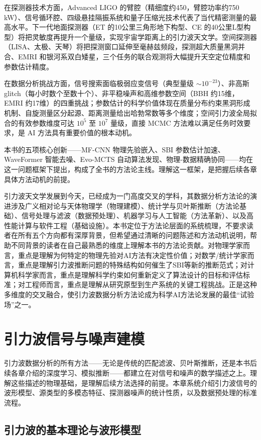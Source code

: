 在探测器技术方面，Advanced LIGO 的臂腔（精细度约450，臂腔功率约750 kW）、信号循环腔、四级悬挂隔振系统和量子压缩光技术代表了当代精密测量的最高水平。下一代地面探测器（ET 的10公里三角形地下构型、CE 的40公里L型构型）将把灵敏度再提升一个量级，实现宇宙学距离上的引力波天文学。空间探测器（LISA、太极、天琴）将把探测窗口延伸至毫赫兹频段，探测超大质量黑洞并合、EMRI 和银河系双白矮星，三个任务的联合观测将大幅提升天空定位精度和参数估计精度。

在数据分析挑战方面，信号搜索面临极弱应变信号（典型量级 $\sim10^{-23}$）、非高斯 glitch（每小时数个至数十个）、非平稳噪声和高维参数空间（BBH 约15维，EMRI 约17维）的四重挑战；参数估计的科学价值体现在质量分布约束黑洞形成机制、自旋测量区分起源、距离测量给出哈勃常数等多个维度；空间引力波全局拟合的有效参数维度可达 $10^5$ 至 $10^7$ 量级，直接 MCMC 方法难以满足任务时效要求，是 AI 方法具有重要价值的根本动机。

本书的五项核心创新——MF-CNN 物理先验嵌入、SBI 参数估计加速、WaveFormer 智能去噪、Evo-MCTS 自动算法发现、物理-数据精确协同——均在这一问题框架下提出，构成了全书的方法论主线。理解这一框架，是把握后续各章具体方法动机的前提。

引力波天文学发展到今天，已经成为一门高度交叉的学科，其数据分析方法论的演进涉及广义相对论与天体物理学（物理建模）、统计学与贝叶斯推断（方法论基础）、信号处理与滤波（数据预处理）、机器学习与人工智能（方法革新）、以及高性能计算与软件工程（基础设施）。本书定位于方法论层面的系统梳理，不要求读者在所有五个方向都有深厚背景，但希望通过清晰的问题陈述和方法动机说明，帮助不同背景的读者在自己最熟悉的维度上理解本书的方法论贡献。对物理学家而言，重点是理解为何特定的物理先验对AI方法有决定性价值；对数学/统计学家而言，重点是理解引力波推断问题的特殊结构如何催生了SBI等新的推断范式；对计算机科学家而言，重点是理解科学约束如何重新定义了算法设计的目标和评估标准；对工程师而言，重点是理解从研究原型到生产系统的关键工程挑战。正是这种多维度的交叉融合，使引力波数据分析方法论成为科学AI方法论发展的最佳“试验场”之一。

\chapter{引力波信号与噪声建模}

引力波数据分析的所有方法——无论是传统的匹配滤波、贝叶斯推断，还是本书后续各章介绍的深度学习、模拟推断——都建立在对信号和噪声的数学描述之上。理解这些描述的物理基础，是理解后续方法选择的前提。本章系统介绍引力波信号的波形模型、源类型的多模态特征、探测器噪声的统计性质，以及数据预处理的标准流程。

\section{引力波的基本理论与波形模型}


